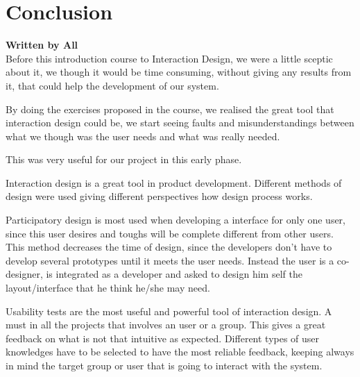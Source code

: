 \chapter{Conclusion}
\textbf{Written by All}\\

Before this introduction course to Interaction Design, we were a little sceptic about it, we though it would be time consuming, without giving any results from it, that could help the development of our system.

By doing the exercises proposed in the course, we realised the great tool that interaction design could be, we start seeing faults and misunderstandings between what we though was the user needs and what was really needed.

This was very useful for our project in this early phase.

Interaction design is a great tool in product development. Different methods of design were used giving different perspectives how design process works.

Participatory design is most used when developing a interface for only one user, since this user desires and toughs will be complete different from other users. This method decreases the time of design, since the developers don't have to develop several prototypes until it meets the user needs. Instead the user is a co-designer, is integrated as a developer and asked to design him self the layout/interface that he think he/she may need.

Usability tests are the most useful and powerful tool of interaction design. A must in all the projects that involves an user or a group. This gives a great feedback on what is not that intuitive as expected. Different types of user knowledges have to be selected to have the most reliable feedback, keeping always in mind the target group or user that is going to interact with the system.